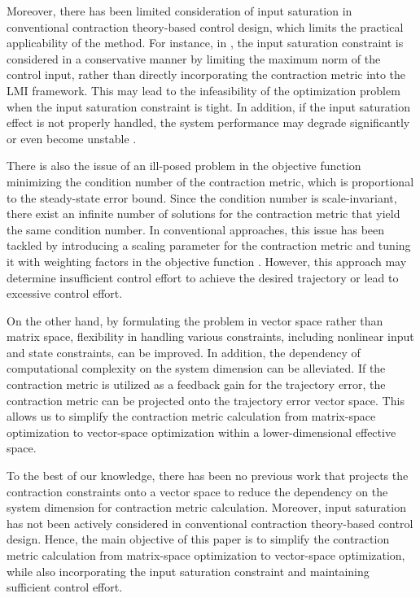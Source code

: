 \documentclass{ifacconf}
\begin{document}
Moreover, there has been limited consideration of input saturation in conventional contraction theory-based control design, which limits the practical applicability of the method.
For instance, in \cite{Tsukamoto:2019aa}, the input saturation constraint is considered in a conservative manner by limiting the maximum norm of the control input, rather than directly incorporating the contraction metric into the LMI framework.
This may lead to the infeasibility of the optimization problem when the input saturation constraint is tight.
In addition, if the input saturation effect is not properly handled, the system performance may degrade significantly or even become unstable \cite{Ryu:2025aa}.

There is also the issue of an ill-posed problem in the objective function minimizing the condition number of the contraction metric, which is proportional to the steady-state error bound.
Since the condition number is scale-invariant, there exist an infinite number of solutions for the contraction metric that yield the same condition number.
In conventional approaches, this issue has been tackled by introducing a scaling parameter for the contraction metric and tuning it with weighting factors in the objective function \cite{Tsukamoto:2019aa,Tsukamoto:2021ae}.
However, this approach may determine insufficient control effort to achieve the desired trajectory or lead to excessive control effort.

On the other hand, by formulating the problem in vector space rather than matrix space, flexibility in handling various constraints, including nonlinear input and state constraints, can be improved.
In addition, the dependency of computational complexity on the system dimension can be alleviated.
If the contraction metric is utilized as a feedback gain for the trajectory error, the contraction metric can be projected onto the trajectory error vector space.
This allows us to simplify the contraction metric calculation from matrix-space optimization to vector-space optimization within a lower-dimensional effective space.

To the best of our knowledge, there has been no previous work that projects the contraction constraints onto a vector space to reduce the dependency on the system dimension for contraction metric calculation.
Moreover, input saturation has not been actively considered in conventional contraction theory-based control design.
Hence, the main objective of this paper is to simplify the contraction metric calculation from matrix-space optimization to vector-space optimization, while also incorporating the input saturation constraint and maintaining sufficient control effort.
\end{document}

